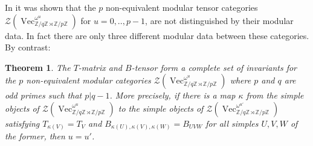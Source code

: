 \documentclass[a4paper, 10pt]{book}
\newtheorem{Thm}{Theorem}[chapter]
\theoremstyle{definition}
\numberwithin{equation}{chapter}
\newcommand\Vect{\operatorname{Vec}}
\newcommand\ZZ{\mathbb Z}
\newcommand\CTR{\mathcal Z}
\newcommand\semdir{\rtimes}
\begin{document}
In \cite{2017arXiv170802796M} it was shown that the $p$ non-equivalent modular tensor categories  $\CTR(\Vect_{\ZZ/q\ZZ \semdir \ZZ/p\ZZ}^{\omega^u})$ for $u=0,..,p-1$, are not distinguished by their modular data. In fact there are only three different modular data between these categories. By contrast:
\begin{Thm}\label{mainthm}
The $T$-matrix and $B$-tensor form a complete set of invariants for the $p$ non-equivalent modular categories $\CTR(\Vect_{\ZZ/q\ZZ \semdir \ZZ/p\ZZ}^{\omega^u})$ where $p$ and $q$ are odd primes such that $p|q-1$. More precisely, if there is a map $\kappa$ from the simple objects of $\CTR(\Vect_{\ZZ/q\ZZ \semdir \ZZ/p\ZZ}^{\omega^u})$ to the simple objects of $\CTR(\Vect_{\ZZ/q\ZZ \semdir \ZZ/p\ZZ}^{\omega^{u'}})$ satisfying $T_{\kappa(V)}=T_{V}$ and $B_{\kappa(U),\kappa(V),\kappa(W)}=B_{UVW}$ for all simples $U,V,W$ of the former, then $u=u'$.
\end{Thm}
\end{document}
